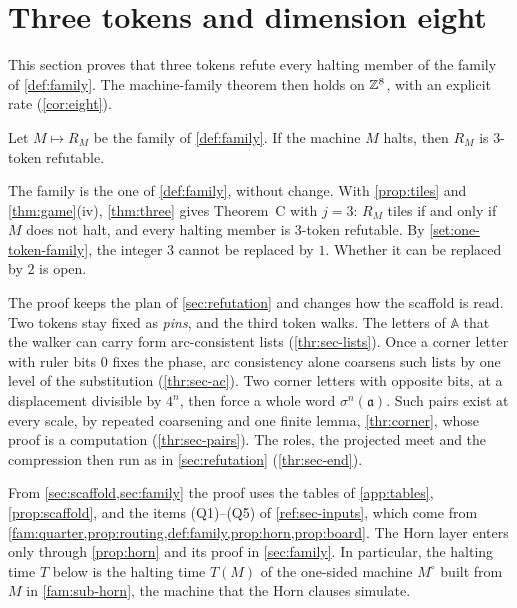 \section{Three tokens and dimension eight}\label{sec:three}

This section proves that three tokens refute every halting member of the family of \cref{def:family}. The machine-family theorem then holds on $\mathbb{Z}^8$, with an explicit rate (\cref{cor:eight}).

\begin{theorem}\label{thm:three}
Let $M\mapsto R_M$ be the family of \cref{def:family}. If the machine $M$ halts, then $R_M$ is $3$-token refutable.
\end{theorem}

The family is the one of \cref{def:family}, without change. With \cref{prop:tiles} and \cref{thm:game}(iv), \cref{thm:three} gives Theorem~C with $j=3$: $R_M$ tiles if and only if $M$ does not halt, and every halting member is $3$-token refutable. By \cref{set:one-token-family}, the integer $3$ cannot be replaced by $1$. Whether it can be replaced by $2$ is open.

The proof keeps the plan of \cref{sec:refutation} and changes how the scaffold is read. Two tokens stay fixed as \emph{pins}, and the third token walks. The letters of $\mathbb A$ that the walker can carry form arc-consistent lists (\cref{thr:sec-lists}). Once a corner letter with ruler bits $0$ fixes the phase, arc consistency alone coarsens such lists by one level of the substitution (\cref{thr:sec-ac}). Two corner letters with opposite bits, at a displacement divisible by $4^n$, then force a whole word $\sigma^n(\mathfrak a)$. Such pairs exist at every scale, by repeated coarsening and one finite lemma, \cref{thr:corner}, whose proof is a computation (\cref{thr:sec-pairs}). The roles, the projected meet and the compression then run as in \cref{sec:refutation} (\cref{thr:sec-end}).

From \cref{sec:scaffold,sec:family} the proof uses the tables of \cref{app:tables}, \cref{prop:scaffold}, and the items (Q1)--(Q5) of \cref{ref:sec-inputs}, which come from \cref{fam:quarter,prop:routing,def:family,prop:horn,prop:board}. The Horn layer enters only through \cref{prop:horn} and its proof in \cref{sec:family}. In particular, the halting time $T$ below is the halting time $T(M)$ of the one-sided machine $M^\circ$ built from $M$ in \cref{fam:sub-horn}, the machine that the Horn clauses simulate.


